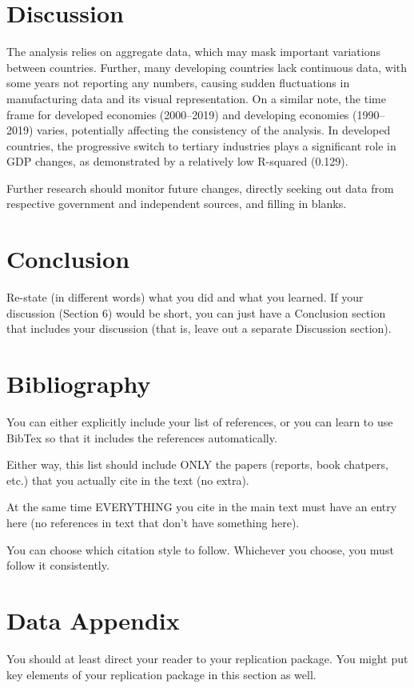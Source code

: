 \documentclass[12pt]{article}
\begin{document}
\section{Discussion}
\label{sec:discussion}


The analysis relies on aggregate data, which may mask important variations between countries. Further, many developing countries lack continuous data, with some years not reporting any numbers, causing sudden fluctuations in manufacturing data and its visual representation. On a similar note, the time frame for developed economies (2000–2019) and developing economies (1990–2019) varies, potentially affecting the consistency of the analysis.
In developed countries, the progressive switch to tertiary industries plays a significant role in GDP changes, as demonstrated by a relatively low R-squared (0.129).

Further research should monitor future changes, directly seeking out data from respective government and independent sources, and filling in blanks.


\section{Conclusion}
\label{sec:conclusion}

Re-state (in different words) what you did and what you learned. If your discussion (Section 6) would be short, you can just have a Conclusion section that includes your discussion (that is, leave out a separate Discussion section).

\newpage
\section*{Bibliography}
\singlespacing
\setlength\bibsep{0pt}

You can either explicitly include your list of references, or you can learn to use BibTex so that it includes the references automatically.

Either way, this list should include ONLY the papers (reports, book chatpers, etc.) that you actually cite in the text (no extra).

At the same time EVERYTHING you cite in the main text must have an entry here (no references in text that don't have something here).

You can choose which citation style to follow. Whichever you choose, you must follow it consistently.

\newpage
\section*{Data Appendix} \label{sec:appendixa}

You should at least direct your reader to your replication package. You might put key elements of your replication package in this section as well.
\end{document}
